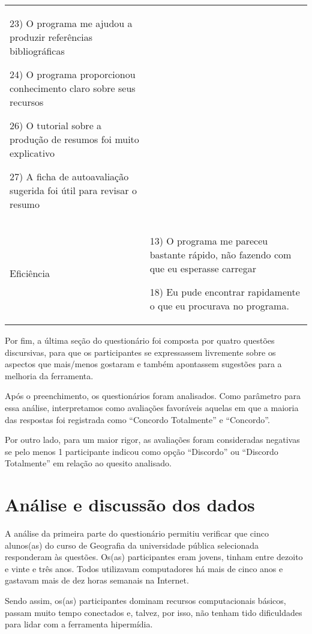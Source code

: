 \documentclass[portuguese]{textolivre}
\begin{document}
\begin{table}[htbp]
\begin{threeparttable}
\begin{small}
\begin{tabular}{p{2cm} p{8cm}}
23) O programa me ajudou a produzir referências bibliográficas

24) O programa proporcionou conhecimento claro sobre seus recursos

26) O tutorial sobre a produção de resumos foi muito explicativo

27) A ficha de autoavaliação sugerida foi útil para revisar o resumo \\
Eficiência &
13) O programa me pareceu bastante rápido, não fazendo com que eu esperasse carregar

18) Eu pude encontrar rapidamente o que eu procurava no programa. \\
\bottomrule
\end{tabular}
\end{small}
\end{threeparttable}
\end{table}

Por fim, a última seção do questionário foi composta por quatro questões discursivas, para que os participantes se expressassem livremente sobre os aspectos que mais/menos gostaram e também apontassem sugestões para a melhoria da ferramenta.

Após o preenchimento, os questionários foram analisados. Como parâmetro para essa análise, interpretamos como avaliações favoráveis aquelas em que a maioria das respostas foi registrada como “Concordo Totalmente” e “Concordo”.

Por outro lado, para um maior rigor, as avaliações foram consideradas negativas se pelo menos 1 participante indicou como opção “Discordo” ou “Discordo Totalmente” em relação ao quesito analisado.

\section{Análise e discussão dos dados}\label{sec-analise}
A análise da primeira parte do questionário permitiu verificar que cinco alunos(as) do curso de Geografia da universidade pública selecionada responderam às questões. Os(as) participantes eram jovens, tinham entre dezoito e vinte e três anos. Todos utilizavam computadores há mais de cinco anos e gastavam mais de dez horas semanais na Internet.

Sendo assim, os(as) participantes dominam recursos computacionais básicos, passam muito tempo conectados e, talvez, por isso, não tenham tido dificuldades para lidar com a ferramenta hipermídia.
\end{document}
